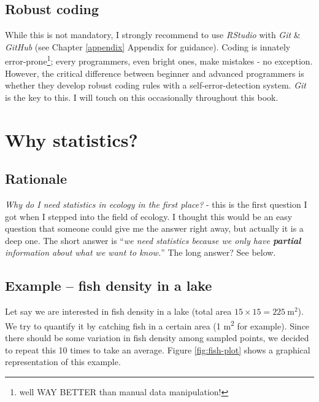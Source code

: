\documentclass[
]{book}
\begin{document}
\hypertarget{robust-coding}{%
\section{Robust coding}\label{robust-coding}}

While this is not mandatory, I strongly recommend to use \emph{RStudio} with \emph{Git} \& \emph{GitHub} (see Chapter \ref{appendix} Appendix for guidance). Coding is innately error-prone\footnote{well WAY BETTER than manual data manipulation!}; every programmers, even bright ones, make mistakes - no exception. However, the critical difference between beginner and advanced programmers is whether they develop robust coding rules with a self-error-detection system. \emph{Git} is the key to this. I will touch on this occasionally throughout this book.

\hypertarget{why-statistics}{%
\chapter{Why statistics?}\label{why-statistics}}

\hypertarget{rationale}{%
\section{Rationale}\label{rationale}}

\emph{Why do I need statistics in ecology in the first place?} - this is the first question I got when I stepped into the field of ecology. I thought this would be an easy question that someone could give me the answer right away, but actually it is a deep one. The short answer is ``\emph{we need statistics because we only have \textbf{partial} information about what we want to know.}'' The long answer? See below.

\hypertarget{example-fish-density-in-a-lake}{%
\section{Example -- fish density in a lake}\label{example-fish-density-in-a-lake}}

Let say we are interested in fish density in a lake (total area \(15 \times 15 = 225~\text{m}^2\)). We try to quantify it by catching fish in a certain area (1 m\textsuperscript{2} for example). Since there should be some variation in fish density among sampled points, we decided to repeat this 10 times to take an average. Figure \ref{fig:fish-plot} shows a graphical representation of this example.
\end{document}
